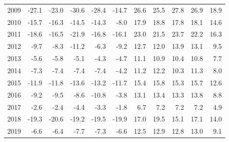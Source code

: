 \documentclass{article}
\begin{document}
\begin{table}[!ht]
\begin{tabular}{l || rrr || rr || rrr || rr }
        2009 & -27.1 & \cellcolor{green!25}-23.0 & \cellcolor{red!25}-30.6 & \cellcolor{red!25}-28.4 & -14.7 & 26.6 & \cellcolor{green!25}25.5 & \cellcolor{red!25}27.8 & \cellcolor{red!25}26.9 & 18.9 \\ 
        2010 & -15.7 & \cellcolor{red!25}-16.3 & \cellcolor{green!25}-14.5 & \cellcolor{red!25}-14.3 & -8.0 & 17.9 & \cellcolor{red!25}18.8 & \cellcolor{green!25}17.8 & \cellcolor{red!25}18.1 & 14.6 \\ 
        2011 & -18.6 & \cellcolor{green!25}-16.5 & \cellcolor{red!25}-21.9 & \cellcolor{red!25}-16.8 & -16.1 & 23.0 & \cellcolor{green!25}21.5 & \cellcolor{red!25}23.7 & \cellcolor{red!25}22.2 & 16.3 \\ 
        2012 & -9.7 & \cellcolor{green!25}-8.3 & \cellcolor{red!25}-11.2 & -6.3 & \cellcolor{red!25}-9.2 & 12.7 & \cellcolor{green!25}12.0 & \cellcolor{red!25}13.9 & \cellcolor{red!25}13.1 & 9.5 \\ 
        2013 & -5.6 & \cellcolor{red!25}-5.8 & \cellcolor{green!25}-5.1 & -4.3 & \cellcolor{red!25}-4.7 & \cellcolor{red!25}11.1 & 10.9 & \cellcolor{green!25}10.4 & \cellcolor{red!25}10.8 & 7.7 \\ 
        2014 & \cellcolor{green!25}-7.3 & \cellcolor{red!25}-7.4 & \cellcolor{red!25}-7.4 & \cellcolor{red!25}-7.4 & -4.2 & 11.2 & \cellcolor{red!25}12.2 & \cellcolor{green!25}10.3 & \cellcolor{red!25}11.3 & 8.0 \\ 
        2015 & -11.9 & \cellcolor{green!25}-11.8 & \cellcolor{red!25}-13.6 & \cellcolor{red!25}-13.2 & -11.7 & 15.4 & \cellcolor{red!25}15.8 & \cellcolor{green!25}15.3 & \cellcolor{red!25}15.7 & 12.6 \\ 
        2016 & -9.2 & \cellcolor{red!25}-9.5 & \cellcolor{green!25}-8.6 & \cellcolor{red!25}-10.8 & -3.8 & \cellcolor{green!25}13.1 & \cellcolor{red!25}13.4 & 13.3 & \cellcolor{red!25}13.8 & 8.8 \\ 
        2017 & -2.6 & \cellcolor{green!25}-2.4 & \cellcolor{red!25}-4.4 & \cellcolor{red!25}-3.3 & -1.8 & \cellcolor{green!25}6.7 & \cellcolor{red!25}7.2 & \cellcolor{red!25}7.2 & \cellcolor{red!25}7.2 & 4.9 \\ 
        2018 & -19.3 & \cellcolor{red!25}-20.6 & \cellcolor{green!25}-19.2 & -19.5 & \cellcolor{red!25}-19.9 & 17.0 & \cellcolor{red!25}19.5 & \cellcolor{green!25}15.1 & \cellcolor{red!25}17.1 & 14.0 \\ 
        2019 & -6.6 & \cellcolor{green!25}-6.4 & \cellcolor{red!25}-7.7 & \cellcolor{red!25}-7.3 & -6.6 & \cellcolor{green!25}12.5 & \cellcolor{red!25}12.9 & 12.8 & \cellcolor{red!25}13.0 & 9.1 \\ 

\end{tabular}
\end{table}
\end{document}
